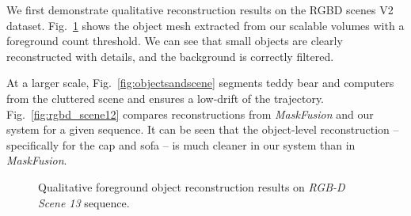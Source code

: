 We first demonstrate qualitative reconstruction results on the RGBD scenes V2 dataset.  Fig.~\ref{fig:rgbd_scene13} shows the object mesh extracted from our scalable volumes with a foreground count threshold. We can see that small objects are clearly reconstructed with details, and the background is correctly filtered.

At a larger scale, Fig.~\ref{fig:objectsandscene} segments teddy bear and computers from the cluttered scene and ensures a low-drift of the trajectory. Fig.~\ref{fig:rgbd_scene12} compares reconstructions from \textit{MaskFusion} \cite{runzMaskFusionRealTimeRecognition2018} and our system for a given sequence. It can be seen that the object-level reconstruction -- specifically for the cap and sofa -- is much cleaner in our system than in \textit{MaskFusion}.

\begin{figure}[t!]
    \centering
    \caption{Qualitative foreground object reconstruction results on \emph{RGB-D Scene 13} sequence.}
    \vspace*{-1em}
    \label{fig:rgbd_scene13}
\end{figure}

